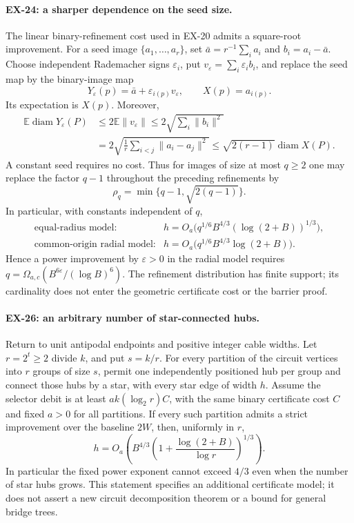 \paragraph{EX-24: a sharper dependence on the seed size.}
The linear binary-refinement cost used in EX-20 admits a square-root
improvement. For a seed image $\{a_1,\ldots,a_r\}$, set
$\bar a=r^{-1}\sum_i a_i$ and $b_i=a_i-\bar a$. Choose independent
Rademacher signs $\varepsilon_i$, put
$v_\varepsilon=\sum_i\varepsilon_i b_i$, and replace the seed map
by the binary-image map
\[
 Y_\varepsilon(p)=\bar a+
        \varepsilon_{i(p)}v_\varepsilon,
 \qquad X(p)=a_{i(p)}.
\]
Its expectation is $X(p)$. Moreover,
\begin{align*}
 \mathbb E\operatorname{diam}Y_\varepsilon(P)
 &\leq2\mathbb E\|v_\varepsilon\|
 \leq2\sqrt{\sum_i\|b_i\|^2}\\
 &=2\sqrt{\frac1r\sum_{i<j}\|a_i-a_j\|^2}
 \leq\sqrt{2(r-1)}\operatorname{diam}X(P).
\end{align*}
A constant seed requires no cost. Thus for images of size at most
$q\geq2$ one may replace the factor $q-1$ throughout the preceding
refinements by
\[
 \rho_q=\min\{q-1,\sqrt{2(q-1)}\}.
\]
In particular, with constants independent of $q$,
\[
 \begin{array}{ll}
 \text{equal-radius model:}&
 h=O_a\bigl(q^{1/6}B^{4/3}(\log(2+B))^{1/3}\bigr),\\[2pt]
 \text{common-origin radial model:}&
 h=O_a\bigl(q^{1/6}B^{4/3}\log(2+B)\bigr).
 \end{array}
\]
Hence a power improvement by $\varepsilon>0$ in the radial model
requires $q=\Omega_{a,c}(B^{6\varepsilon}/(\log B)^6)$.
The refinement distribution has finite support; its cardinality
does not enter the geometric certificate cost or the barrier proof.

\paragraph{EX-26: an arbitrary number of star-connected hubs.}
Return to unit antipodal endpoints and positive integer cable widths.
Let $r=2^t\ge2$ divide $k$, and put $s=k/r$. For every partition
of the circuit vertices into $r$ groups of size $s$, permit one
independently positioned hub per group and connect those hubs by
a star, with every star edge of width $h$. Assume the selector
debit is at least $ak(\log_2r)C$, with the same binary certificate
cost $C$ and fixed $a>0$ for all partitions. If every such partition
admits a strict improvement over the baseline $2W$, then, uniformly
in $r$,
\[
 h=O_a\!\left(B^{4/3}
       \left(1+\frac{\log(2+B)}{\log r}\right)^{1/3}\right).
 \tag{EX26.1}
\]
In particular the fixed power exponent cannot exceed $4/3$ even
when the number of star hubs grows. This statement specifies an
additional certificate model; it does not assert a new circuit
decomposition theorem or a bound for general bridge trees.

